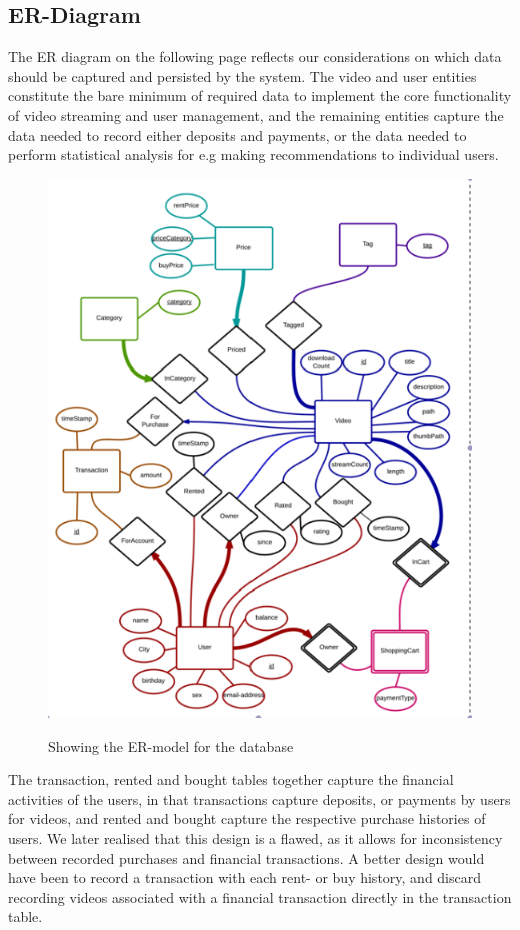 \subsection{ER-Diagram}
The ER diagram on the following page reflects our considerations on which data should be captured and persisted by the system. The video and user entities constitute the bare minimum of required data to implement the core functionality of video streaming and user management, and the remaining entities capture the data needed to record either deposits and payments, or the data needed to perform statistical analysis for e.g making recommendations to individual users.

\begin{figure}[H]
\centering
\includegraphics[scale=0.8]{ERDiagram2.png}
\label{ERdiagram}
\caption{Showing the ER-model for the database}
\end{figure}

The transaction, rented and bought tables together capture the financial activities of the users, in that transactions capture deposits, or payments by users for videos, and rented and bought capture the respective purchase histories of users. 
We later realised that this design is a flawed, as it allows for inconsistency between recorded purchases and financial transactions. A better design would have been to record a transaction with each rent- or buy history, and discard recording videos associated with a financial transaction directly in the transaction table.

